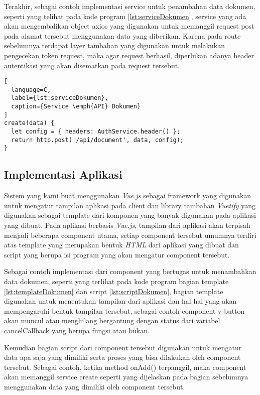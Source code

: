 Terakhir, sebagai contoh implementasi service untuk penambahan data dokumen, seperti yang telihat pada kode program \ref{lst:serviceDokumen}, service yang ada akan mengembalikan object axios yang digunakan untuk memanggil request post pada alamat tersebut menggunakan data yang diberikan.
Karena pada route sebelumnya terdapat layer tambahan yang digunakan untuk melakukan pengecekan token request, maka agar request berhasil, diperlukan adanya header autentikasi yang akan disematkan pada request tersebut.
\vspace{0.5ex}

\begin{lstlisting}[
  language=C,
  label={lst:serviceDokumen},
  caption={Service \emph{API} Dokumen}
]
create(data) {
  let config = { headers: AuthService.header() };
  return http.post('/api/document', data, config);
}
\end{lstlisting}
\vspace{0.5ex}

\subsection{Implementasi Aplikasi}
\vspace{1ex}

Sistem yang kami buat menggunakan \emph{Vue.js} sebagai framework yang digunakan untuk mengatur tampilan aplikasi pada client dan library tambahan \emph{Vuetify} yang digunakan sebagai template dari komponen yang banyak digunakan pada aplikasi yang dibuat.
Pada aplikasi berbasis \emph{Vue.js}, tampilan dari aplikasi akan terpisah menjadi beberapa component utama, setiap component tersebut umumnya terdiri atas template yang merupakan bentuk \emph{HTML} dari aplikasi yang dibuat dan script yang berupa isi program yang akan mengatur component tersebut.
\vspace{0.5ex}

\newpage

Sebagai contoh implementasi dari component yang bertugas untuk menambahkan data dokumen, seperti yang terlihat pada kode program bagian template \ref{lst:templateDokumen} dan script \ref{lst:scriptDokumen}, bagian template digunakan untuk menentukan tampilan dari aplikasi dan hal hal yang akan mempengaruhi bentuk tampilan tersebut, sebagai contoh component v-button akan muncul atau menghilang bergantung dengan status dari variabel cancelCallback yang berupa fungsi atau bukan.
\vspace{0.5ex}

Kemudian bagian script dari component tersebut digunakan untuk mengatur data apa saja yang dimiliki serta proses yang bisa dilakukan oleh component tersebut.
Sebagai contoh, ketika method onAdd() terpanggil, maka component akan memanggil service create seperti yang dijelaskan pada bagian sebelumnya menggunakan data yang dimiliki oleh component tersebut.
\vspace{0.5ex}

